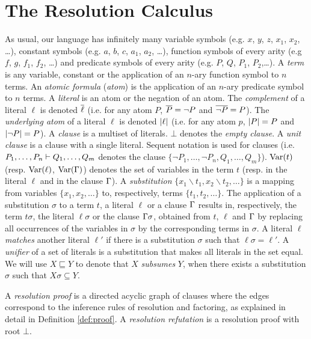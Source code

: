 \section{The Resolution Calculus}
\label{sec:res}

As usual, our language has infinitely many variable symbols (e.g. $x$, $y$, $z$, $x_1$, $x_2$, \ldots), constant symbols (e.g. $a$, $b$, $c$, $a_1$, $a_2$, \ldots), function symbols of every arity (e.g $f$, $g$, $f_1$, $f_2$, \ldots) and predicate symbols of every arity (e.g. $P$, $Q$, $P_1$, $P_2$,\ldots). A \emph{term} is any variable, constant or the application of an $n$-ary function symbol to $n$ terms.
An \emph{atomic formula} (\emph{atom}) is the application of an $n$-ary predicate symbol to $n$ terms. A \emph{literal} is an atom or the negation of an atom. The
\emph{complement} of a literal $\ell$ is denoted $\overline{\ell}$ (i.e. for any atom $P$,
$\overline{P} = \neg P$ and $\overline{\neg P} = P$). The \emph{underlying atom} of a literal $\ell$ is denoted $\lvert\ell\rvert$ (i.e. for any atom $p$, $\lvert P\rvert = P$ and $\lvert\neg P\rvert = P$). A
\emph{clause} is a multiset of literals. $\bot$ denotes the \emph{empty clause}. A \emph{unit clause} is a clause with a single literal. Sequent notation is used for clauses (i.e. $P_1,\ldots,P_n \vdash Q_1,\ldots, Q_m$ denotes the clause $\{ \neg P_1,\ldots, \neg P_n, Q_1, \ldots, Q_m \}$).
$\mathrm{Var}(t)$ (resp. $\mathrm{Var}(\ell)$, $\mathrm{Var}(\Gamma)$) denotes the set of variables in the term $t$ (resp. in the literal $\ell$ and in the clause $\Gamma$).
A \emph{substitution} $\{ x_1\backslash t_1, x_2 \backslash t_2, \ldots \}$ is a mapping from variables $\{ x_1, x_2, \ldots \}$ to, respectively, terms $\{t_1, t_2, \ldots \}$. The application of a substitution $\sigma$ to a term $t$, a literal $\ell$ or a clause $\Gamma$ results in, respectively, the term $t \sigma$, the literal $\ell \sigma$ or the clause $\Gamma \sigma$, obtained from $t$, $\ell$ and $\Gamma$ by replacing all occurrences of the variables in $\sigma$ by the corresponding terms in $\sigma$. A literal $\ell$ \emph{matches} another literal $\ell'$ if there is a substitution $\sigma$ such that $\ell\sigma=\ell'$. A \emph{unifier} of a set of literals is a substitution that makes all literals in the set equal. We will use $X \sqsubseteq Y$ to denote that $X$ \emph{subsumes} $Y$, when there exists a substitution $\sigma$ such that $X\sigma \subseteq Y$.


A \emph{resolution proof} is a directed acyclic graph of clauses where the edges correspond to the inference rules of resolution and factoring, as explained in detail in Definition \ref{def:proof}. A \emph{resolution refutation} is a resolution proof with root $\bot$.

